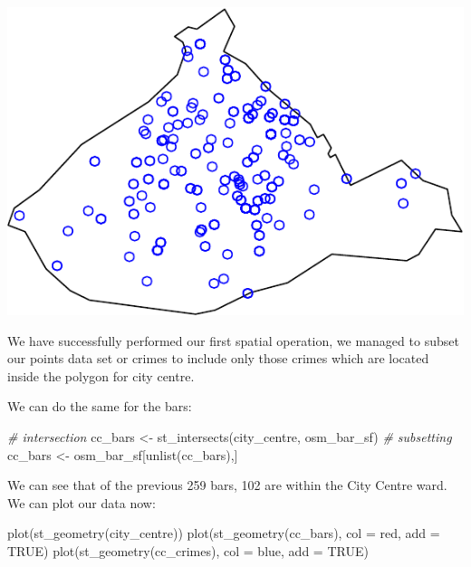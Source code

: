 \documentclass[
]{book}
\newenvironment{Shaded}{\begin{snugshade}}{\end{snugshade}}
\newcommand{\AttributeTok}[1]{\textcolor[rgb]{0.77,0.63,0.00}{#1}}
\newcommand{\CommentTok}[1]{\textcolor[rgb]{0.56,0.35,0.01}{\textit{#1}}}
\newcommand{\ConstantTok}[1]{\textcolor[rgb]{0.00,0.00,0.00}{#1}}
\newcommand{\FunctionTok}[1]{\textcolor[rgb]{0.00,0.00,0.00}{#1}}
\newcommand{\NormalTok}[1]{#1}
\newcommand{\OtherTok}[1]{\textcolor[rgb]{0.56,0.35,0.01}{#1}}
\newcommand{\StringTok}[1]{\textcolor[rgb]{0.31,0.60,0.02}{#1}}
\begin{document}
\includegraphics{crime_mapping_files/figure-latex/plot_crimes_ccentre-1.pdf}

We have successfully performed our first spatial operation, we managed to subset our points data set or crimes to include only those crimes which are located inside the polygon for city centre.

We can do the same for the bars:

\begin{Shaded}
\begin{Highlighting}[]
\CommentTok{\# intersection}
\NormalTok{cc\_bars }\OtherTok{\textless{}{-}} \FunctionTok{st\_intersects}\NormalTok{(city\_centre, osm\_bar\_sf)}
\CommentTok{\# subsetting}
\NormalTok{cc\_bars }\OtherTok{\textless{}{-}}\NormalTok{ osm\_bar\_sf[}\FunctionTok{unlist}\NormalTok{(cc\_bars),]}
\end{Highlighting}
\end{Shaded}

We can see that of the previous 259 bars, 102 are within the City Centre ward. We can plot our data now:

\begin{Shaded}
\begin{Highlighting}[]
\FunctionTok{plot}\NormalTok{(}\FunctionTok{st\_geometry}\NormalTok{(city\_centre))}
\FunctionTok{plot}\NormalTok{(}\FunctionTok{st\_geometry}\NormalTok{(cc\_bars), }\AttributeTok{col =} \StringTok{\textquotesingle{}red\textquotesingle{}}\NormalTok{, }\AttributeTok{add =} \ConstantTok{TRUE}\NormalTok{)}
\FunctionTok{plot}\NormalTok{(}\FunctionTok{st\_geometry}\NormalTok{(cc\_crimes), }\AttributeTok{col =} \StringTok{\textquotesingle{}blue\textquotesingle{}}\NormalTok{, }\AttributeTok{add =} \ConstantTok{TRUE}\NormalTok{)}
\end{Highlighting}
\end{Shaded}
\end{document}
